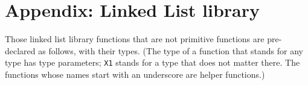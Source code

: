 \section*{Appendix: Linked List library}

Those linked list library functions that are not primitive functions
are pre-declared as follows, with their types. (The type of a function that stands for any type has
type parameters; \lstinline{X1} stands for a type that does not matter there. The functions whose
names start with an underscore are helper functions.)


